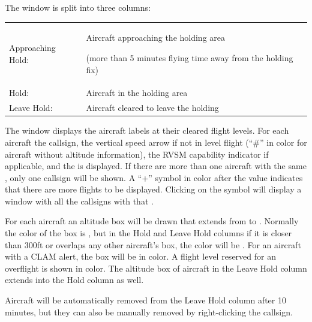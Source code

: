 \documentclass[a4paper,oneside,11pt]{memoir}
\begin{document}
\bigskip

The window is split into three columns:

\bigskip

\begin{longtable}{p{2.5cm} p{10cm}}
    Approaching Hold:   & Aircraft approaching the holding area
    
                          (more than 5 minutes flying time away from the holding fix)\\
    Hold:               & Aircraft in the holding area\\
    Leave Hold:         & Aircraft cleared to leave the holding\\   
\end{longtable}

\bigskip

The window displays the aircraft labels at their cleared flight levels. For each aircraft the callsign, the vertical speed arrow if not in level flight (“\#” in  color for aircraft without altitude information), the RVSM capability indicator if applicable, and the  is displayed. If there are more than one aircraft with the same , only one callsign will be shown. A “+” symbol in  color after the  value indicates that there are more flights to be displayed. Clicking on the symbol will display a window with all the callsigns with that .

\bigskip

For each aircraft an altitude box will be drawn that extends from  to . Normally the color of the box is , but in the Hold and Leave Hold columns if it is closer than 300ft or overlaps any other aircraft’s box, the color will be . For an aircraft with a CLAM alert, the box will be in  color. A flight level reserved for an overflight is shown in  color. The altitude box of aircraft in the Leave Hold column extends into the Hold column as well.


\bigskip

Aircraft will be automatically removed from the Leave Hold column after 10 minutes, but they can also be manually removed by right-clicking the callsign.
\end{document}
